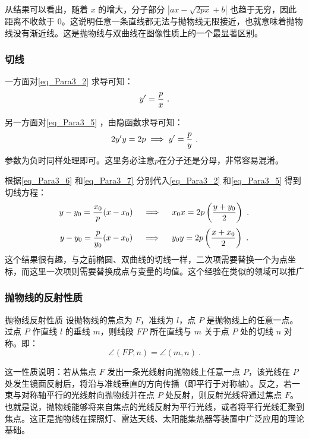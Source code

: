 从结果可以看出，随着 $x$ 的增大，分子部分 $|ax - \sqrt{2px} + b|$ 也趋于无穷，因此距离不收敛于 $0$。这说明任意一条直线都无法与抛物线无限接近，也就意味着抛物线没有渐近线。这是抛物线与双曲线在图像性质上的一个最显著区别。


\subsubsection{切线}

一方面对\autoref{eq_Para3_2} 求导可知：
\begin{equation}\label{eq_Para3_6}
y'={p\over x}~.
\end{equation}

另一方面对\autoref{eq_Para3_5} ，由隐函数求导可知：
\begin{equation}\label{eq_Para3_7}
2y'y=2p\implies y'={p\over y}~.
\end{equation}
参数为负时同样处理即可。这里务必注意$p$在分子还是分母，非常容易混淆。

根据\autoref{eq_Para3_6} 和\autoref{eq_Para3_7} 分别代入\autoref{eq_Para3_2} 和\autoref{eq_Para3_5} 得到切线方程：
\begin{equation}
y-y_0={x_0\over p}(x-x_0)\quad\implies\quad x_0x=2p\left(\frac{y+y_0}{2}\right)~.
\end{equation}
\begin{equation}
y-y_0={p\over y_0}(x-x_0)\quad\implies\quad y_0y=2p\left(\frac{x+x_0}{2}\right)~.
\end{equation}
这个结果很有趣，与之前椭圆、双曲线的切线一样，二次项需要替换一个为点坐标，而这里一次项则需要替换成点与变量的均值。这个经验在类似的领域可以推广

\subsubsection{抛物线的反射性质}

\begin{theorem}{抛物线反射性质}
设抛物线的焦点为 $F$，准线为 $l$，点 $P$ 是抛物线上的任意一点。过点 $P$ 作直线 $l$ 的垂线 $m$，则线段 $FP$ 所在直线与 $m$ 关于点 $P$ 处的切线 $n$ 对称。即：
\begin{equation}
\angle(FP, n) = \angle(m, n)~.
\end{equation}
\end{theorem}

这一性质说明：若从焦点 $F$ 发出一条光线射向抛物线上任意一点 $P$，该光线在 $P$ 处发生镜面反射后，将沿与准线垂直的方向传播（即平行于对称轴）。反之，若一束与对称轴平行的光线射向抛物线并在点 $P$ 处反射，则反射光线将通过焦点 $F$。也就是说，抛物线能够将来自焦点的光线反射为平行光线，或者将平行光线汇聚到焦点。这正是抛物线在探照灯、雷达天线、太阳能集热器等装置中广泛应用的理论基础。

